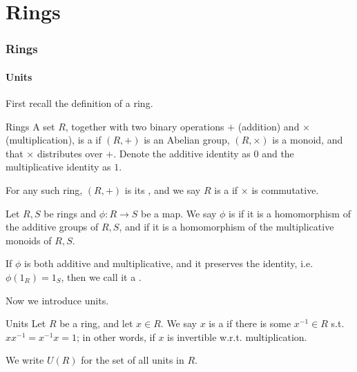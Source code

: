 \documentclass{styles/tufte}
\author{Jiaming (George) Yu}
\date{\today}
\begin{document}
\maketitle
\tableofcontents
\newpage



\part{Rings}

\section{Rings}

\subsection{Units}

First recall the definition of a ring.

\begin{definition}{Rings}{}
  A set $R$, together with two binary operations $+$ (addition) and $\times$ (multiplication), is a  if $(R, +)$ is an Abelian group, $(R, \times)$ is a monoid, and that $\times$ distributes over $+$. Denote the additive identity as $0$ and the multiplicative identity as $1$.
  
  For any such ring, $(R, +)$ is its , and we say $R$ is a  if $\times$ is commutative.
\end{definition}

\begin{definition}{}{}
  Let $R, S$ be rings and $\phi: R \to S$ be a map. We say $\phi$ is  if it is a homomorphism of the additive groups of $R, S$, and  if it is a homomorphism of the multiplicative monoids of $R, S$.
  
  If $\phi$ is both additive and multiplicative, and it preserves the identity, i.e. $\phi(1_R) = 1_S$, then we call it a .
\end{definition}

Now we introduce units.

\begin{definition}{Units}{}
  Let $R$ be a ring, and let $x \in R$. We say $x$ is a  if there is some $x^{-1} \in R$ s.t. $xx^{-1} = x^{-1}x = 1$; in other words, if $x$ is invertible w.r.t. multiplication.
  
  We write $U(R)$ for the set of all units in $R$.
\end{definition}
\end{document}
